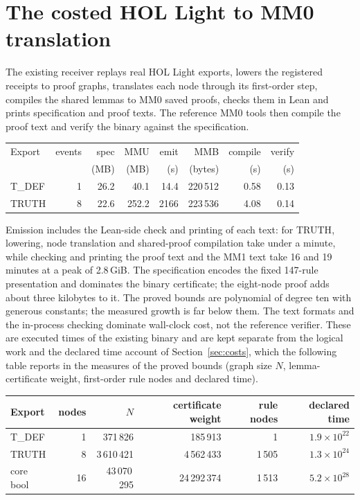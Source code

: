 \documentclass[11pt,a4paper]{article}
\theoremstyle{plain}
\theoremstyle{definition}
\theoremstyle{remark}
\begin{document}
\section{The costed HOL Light to MM0 translation}\label{sec:headline}

The existing receiver replays real HOL Light exports, lowers the registered
receipts to proof graphs, translates each node through its first-order step,
compiles the shared lemmas to MM0 saved proofs, checks them in Lean and prints
specification and proof texts. The reference MM0 tools then compile the proof
text and verify the binary against the specification.

\begin{center}\small
\begin{tabular}{@{}lrrrrrrr@{}}
\toprule
Export & events & spec & MMU & emit & MMB & compile & verify \\
 & & (MB) & (MB) & (s) & (bytes) & (s) & (s) \\
\midrule
\textsf{T\_DEF} & 1 & 26.2 & 40.1 & 14.4 & 220\,512 & 0.58 & 0.13 \\
\textsf{TRUTH} & 8 & 22.6 & 252.2 & 2166 & 223\,536 & 4.08 & 0.14 \\
\bottomrule
\end{tabular}
\end{center}

Emission includes the Lean-side check and printing of each text: for
\textsf{TRUTH}, lowering, node translation and shared-proof compilation take
under a minute, while checking and printing the proof text and the MM1 text take
16 and 19 minutes at a peak of 2.8\,GiB. The specification encodes the fixed
147-rule presentation and dominates the binary certificate; the eight-node
proof adds about three kilobytes to it. The
proved bounds are polynomial of degree ten with generous constants; the measured
growth is far below them. The text formats and the in-process checking dominate
wall-clock cost, not the reference verifier. These are executed times of the
existing binary and are kept separate from the logical work and the declared
time account of Section~\ref{sec:costs}, which the following table reports in
the measures of the proved bounds (graph size $N$, lemma-certificate weight,
first-order rule nodes and declared time).

\begin{center}\small
\begin{tabular}{@{}lrrrrr@{}}
\toprule
Export & nodes & $N$ & certificate weight & rule nodes & declared time \\
\midrule
\textsf{T\_DEF} & 1 & 371\,826 & 185\,913 & 1 & $1.9\times10^{22}$ \\
\textsf{TRUTH} & 8 & 3\,610\,421 & 4\,562\,433 & 1\,505 & $1.3\times10^{24}$ \\
core \textsf{bool} & 16 & 43\,070\,295 & 24\,292\,374 & 1\,513 & $5.2\times10^{28}$ \\
\bottomrule
\end{tabular}
\end{center}
\end{document}
